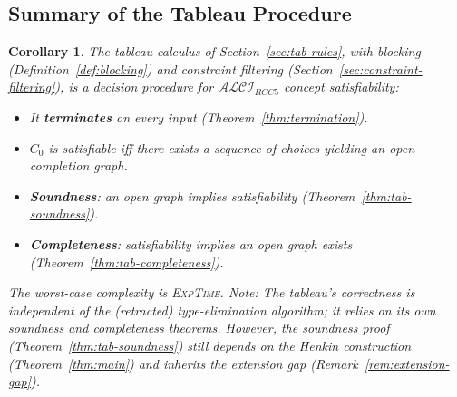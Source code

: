 \documentclass[a4paper,11pt]{article}
\newtheorem{corollary}[theorem]{Corollary}
\theoremstyle{definition}
\newcommand{\ALCIRCC}[1]{\ensuremath{\mathcal{ALCI}_{\mathit{RCC#1}}}}
\newcommand{\EXPTIME}{\textsc{ExpTime}}
\begin{document}
\subsection{Summary of the Tableau Procedure}

\begin{corollary}
\label{cor:tableau-decides}
The tableau calculus of Section~\ref{sec:tab-rules}, with blocking
\textup{(}Definition~\ref{def:blocking}\textup{)} and constraint
filtering \textup{(}Section~\ref{sec:constraint-filtering}\textup{)},
is a decision procedure for $\ALCIRCC{5}$ concept satisfiability:
\begin{itemize}[nosep]
  \item It \textbf{terminates} on every input
    \textup{(}Theorem~\ref{thm:termination}\textup{)}.
  \item $C_0$ is satisfiable iff there exists a sequence of choices
    yielding an open completion graph.
  \item \textbf{Soundness}: an open graph implies satisfiability
    \textup{(}Theorem~\ref{thm:tab-soundness}\textup{)}.
  \item \textbf{Completeness}: satisfiability implies an open graph
    exists \textup{(}Theorem~\ref{thm:tab-completeness}\textup{)}.
\end{itemize}
The worst-case complexity is \EXPTIME.
\emph{Note:} The tableau's correctness is independent of the
(retracted) type-elimination algorithm; it relies on its own
soundness and completeness theorems.  However, the soundness proof
(Theorem~\ref{thm:tab-soundness}) still depends on the Henkin
construction (Theorem~\ref{thm:main}) and inherits the extension gap
(Remark~\ref{rem:extension-gap}).
\end{corollary}
\end{document}
